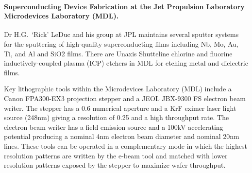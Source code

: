%
%
%

\paragraph{Superconducting Device Fabrication at the Jet Propulsion
Laboratory Microdevices Laboratory (MDL).}

Dr H.G.\ `Rick' LeDuc and his group at JPL maintains several sputter systems for
the sputtering of high-quality superconducting films including Nb,
Mo, Au, Ti, and Al and SiO2 films.  There are Unaxis Shutteline
chlorine and fluorine inductively-coupled plasma (ICP) etchers in
MDL for etching metal and dielectric films.


Key lithographic tools within the Microdevices Laboratory (MDL)
include a Canon FPA300-EX3 projection stepper and a JEOL JBX-9300 FS
electron beam writer. The stepper has a 0.6 numerical aperture and a
KrF eximer laser light source (248nm) giving a resolution of 0.25
\micron and a high throughput rate. The electron beam writer has a
field emission source and a 100kV accelerating potential producing a
nominal 4nm electron beam diameter and nominal 20nm lines.  These
tools can be operated in a complementary mode in which the highest
resolution patterns are written by the e-beam tool and matched with
lower resolution patterns exposed by the stepper to maximize wafer
throughput.

